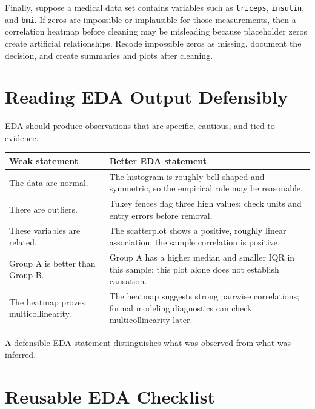 {Finally, suppose a medical data set contains variables such as \texttt{triceps}, \texttt{insulin}, and \texttt{bmi}.  If zeros are impossible or implausible for those measurements, then a correlation heatmap before cleaning may be misleading because placeholder zeros create artificial relationships.  Recode impossible zeros as missing, document the decision, and create summaries and plots after cleaning.

\section{Reading EDA Output Defensibly}

EDA should produce observations that are specific, cautious, and tied to evidence.

\begin{center}
\begin{tabular}{p{}p{}}
\hline
Weak statement & Better EDA statement \\
\hline
The data are normal. & The histogram is roughly bell-shaped and symmetric, so the empirical rule may be reasonable. \\
There are outliers. & Tukey fences flag three high values; check units and entry errors before removal. \\
These variables are related. & The scatterplot shows a positive, roughly linear association; the sample correlation is positive. \\
Group A is better than Group B. & Group A has a higher median and smaller IQR in this sample; this plot alone does not establish causation. \\
The heatmap proves multicollinearity. & The heatmap suggests strong pairwise correlations; formal modeling diagnostics can check multicollinearity later. \\
\hline
\end{tabular}
\end{center}

A defensible EDA statement distinguishes what was observed from what was inferred.

\section{Reusable EDA Checklist}

}
